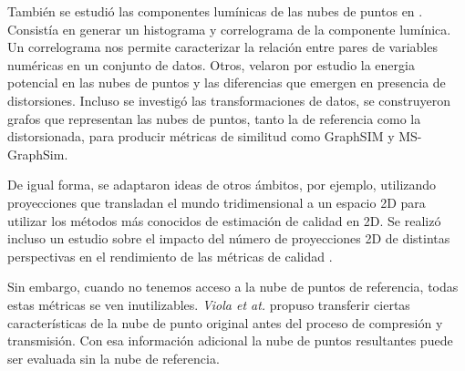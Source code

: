También se estudió las componentes lumínicas de las nubes de puntos en \cite{ColorBasedObjectiveMetricPC, BitDance}. 
Consistía en generar un histograma y correlograma de la componente lumínica. 
Un correlograma nos permite caracterizar la relación entre pares de variables 
numéricas en un conjunto de datos. Otros, velaron por estudio la energia potencial 
en las nubes de puntos y las diferencias que emergen en presencia de distorsiones\cite{PotentialEnergy}.
Incluso se investigó las transformaciones de datos, se construyeron grafos que representan 
las nubes de puntos, tanto la de referencia como la distorsionada, 
para producir métricas de similitud como GraphSIM y MS-GraphSim\cite{GraphSIM, MS-GraphSim}.

De igual forma, se adaptaron ideas de otros ámbitos, por ejemplo, utilizando 
proyecciones que transladan el mundo tridimensional a un espacio 2D para utilizar 
los métodos más conocidos de estimación de calidad en 2D.
Se realizó incluso un estudio sobre el impacto del número de proyecciones 2D de 
distintas perspectivas en el rendimiento de las métricas de calidad \cite{ImpactOf2DProyections}.

Sin embargo, cuando no tenemos acceso a la nube de puntos de referencia, todas 
estas métricas se ven inutilizables. \emph{Viola et at.}\cite{ViolaRR} propuso 
transferir ciertas características de la nube de punto original antes del proceso
de compresión y transmisión. Con esa información adicional la nube de puntos 
resultantes puede ser evaluada sin la nube de referencia.

